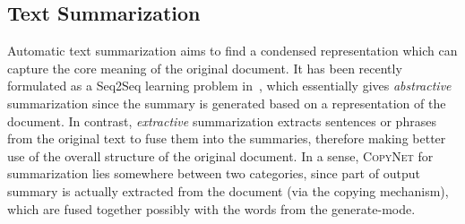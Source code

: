 \subsection{Text Summarization}
Automatic text summarization aims to find a condensed representation which can capture the core meaning of the original document. It has been recently formulated as a Seq2Seq learning problem in~\cite{rush2015neural,hu2015lcsts}, which essentially gives \emph{abstractive} summarization since the summary is generated based on a representation of the document. In contrast, \textit{extractive} summarization extracts sentences or phrases from the original text to fuse them into the summaries, therefore making better use of the overall structure of the original document. In a sense, \textsc{CopyNet} for summarization lies somewhere between two categories, since part of output summary is actually extracted from the document (via the copying mechanism), which are fused together possibly with the words from the generate-mode.\vspace{-5pt}

